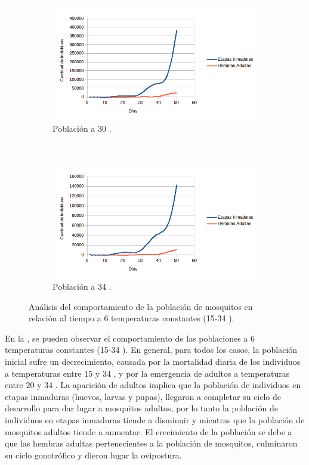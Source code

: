 \begin{figure}[!htbp]
    \begin{subfigure}[b]{0.45\textwidth}
            \includegraphics[width=\textwidth]{capitulo-6/graphics/desarrollo-poblacion-30.png}
            \caption{\label{fig:desarrollo-poblacion-30}Población a 30 \textcelsius.}
    \end{subfigure}
    ~~~~
    \begin{subfigure}[b]{0.45\textwidth}
            \includegraphics[width=\textwidth]{capitulo-6/graphics/desarrollo-poblacion-34.png}
            \caption{\label{fig:desarrollo-poblacion-34}Población a 34 \textcelsius.}
    \end{subfigure}

    \caption{\label{fig:desarrollo-poblacion-all} Análisis del comportamiento de la población de mosquitos en relación al tiempo a 6 temperaturas constantes (15-34 \textcelsius).}
\end{figure}

En la , se pueden observar el comportamiento de las
poblaciones a 6 temperaturas constantes (15-34 \textcelsius). En general, para todos los casos, la
población inicial sufre un decrecimiento, causada por la mortalidad diaria de los individuos a
temperaturas entre 15 y 34 \textcelsius, y por la emergencia de adultos a temperaturas entre 20 y
34 \textcelsius. La aparición de adultos implica que la población de individuos en etapas
inmaduras (huevos, larvas y pupas), llegaron a completar su ciclo de desarrollo para dar lugar a
mosquitos adultos, por lo tanto la población de individuos en etapas inmaduras tiende a disminuir
y mientras que la población de mosquitos adultos tiende a aumentar. El crecimiento de la población
se debe a que las hembras adultas pertenecientes a la población de mosquitos, culminaron su ciclo
gonotrófico y dieron lugar la ovipostura.

